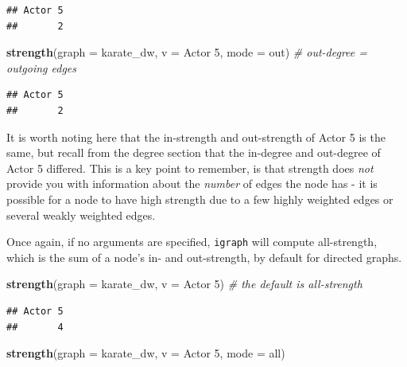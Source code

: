 \documentclass[
]{book}
\newenvironment{Shaded}{\begin{snugshade}}{\end{snugshade}}
\newcommand{\AttributeTok}[1]{\textcolor[rgb]{0.13,0.29,0.53}{#1}}
\newcommand{\CommentTok}[1]{\textcolor[rgb]{0.56,0.35,0.01}{\textit{#1}}}
\newcommand{\FunctionTok}[1]{\textcolor[rgb]{0.13,0.29,0.53}{\textbf{#1}}}
\newcommand{\NormalTok}[1]{#1}
\newcommand{\StringTok}[1]{\textcolor[rgb]{0.31,0.60,0.02}{#1}}
\begin{document}
\begin{verbatim}
## Actor 5 
##       2
\end{verbatim}

\begin{Shaded}
\begin{Highlighting}[]
\FunctionTok{strength}\NormalTok{(}\AttributeTok{graph =}\NormalTok{ karate\_dw, }\AttributeTok{v =} \StringTok{\textquotesingle{}Actor 5\textquotesingle{}}\NormalTok{, }\AttributeTok{mode =} \StringTok{\textquotesingle{}out\textquotesingle{}}\NormalTok{) }\CommentTok{\# out{-}degree = outgoing edges}
\end{Highlighting}
\end{Shaded}

\begin{verbatim}
## Actor 5 
##       2
\end{verbatim}

It is worth noting here that the in-strength and out-strength of Actor 5 is the same, but recall from the degree section that the in-degree and out-degree of Actor 5 differed. This is a key point to remember, is that strength does \emph{not} provide you with information about the \emph{number} of edges the node has - it is possible for a node to have high strength due to a few highly weighted edges or several weakly weighted edges.

Once again, if no arguments are specified, \texttt{igraph} will compute all-strength, which is the sum of a node's in- and out-strength, by default for directed graphs.

\begin{Shaded}
\begin{Highlighting}[]
\FunctionTok{strength}\NormalTok{(}\AttributeTok{graph =}\NormalTok{ karate\_dw, }\AttributeTok{v =} \StringTok{\textquotesingle{}Actor 5\textquotesingle{}}\NormalTok{) }\CommentTok{\# the default is all{-}strength}
\end{Highlighting}
\end{Shaded}

\begin{verbatim}
## Actor 5 
##       4
\end{verbatim}

\begin{Shaded}
\begin{Highlighting}[]
\FunctionTok{strength}\NormalTok{(}\AttributeTok{graph =}\NormalTok{ karate\_dw, }\AttributeTok{v =} \StringTok{\textquotesingle{}Actor 5\textquotesingle{}}\NormalTok{, }\AttributeTok{mode =} \StringTok{\textquotesingle{}all\textquotesingle{}}\NormalTok{) }
\end{Highlighting}
\end{Shaded}
\end{document}
